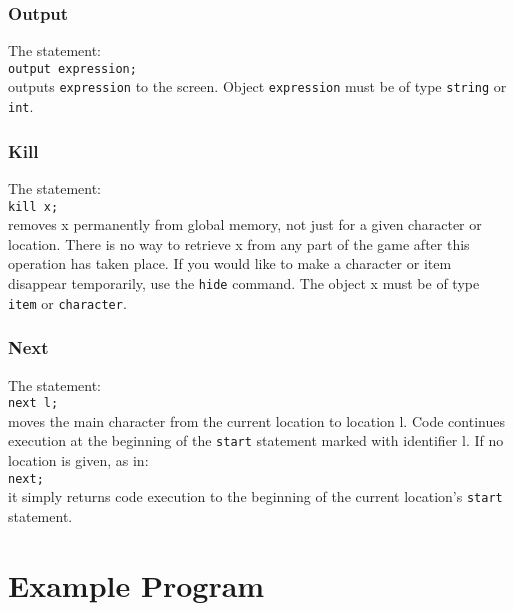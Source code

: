 \documentclass[12pt]{article}
\begin{document}
\noindent

\subsubsection{Output}
The statement: \\

\texttt{output expression;} \\

\noindent outputs \texttt{expression} to the screen.  Object \texttt{expression} must be of type \texttt{string} or \texttt{int}.

\subsubsection{Kill}
The statement: \\

\texttt{kill x;} \\

\noindent removes x permanently from global memory, not just for a given character or location.  There is no way to retrieve x from any part of the game after this operation has taken place.  If you would like to make a character or item disappear temporarily, use the \texttt{hide} command.  The object  x must be of type \texttt{item} or \texttt{character}.

\subsubsection{Next}
The statement: \\

\texttt{next l;} \\

\noindent moves the main character from the current location to location l.  Code continues execution at the beginning of the \texttt{start} statement marked with identifier l.  If no location is given, as in: \\

\texttt{next;} \\

\noindent it simply returns code execution to the beginning of the current location's \texttt{start} statement.

\section{Example Program}
\end{document}
